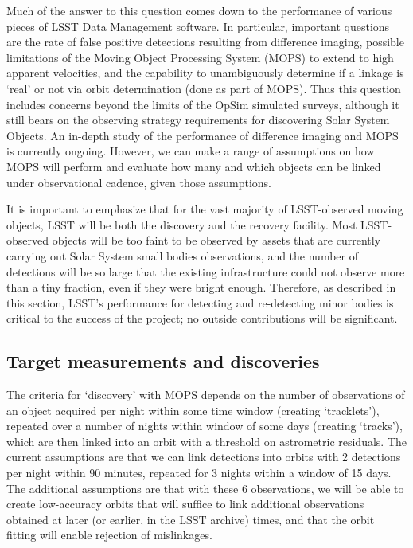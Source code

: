 Much of the answer to this question comes down to the performance of
various pieces of LSST Data Management software. In particular,
important questions are the
rate of false positive detections resulting from difference imaging, possible
limitations of the Moving Object Processing System (MOPS) to extend to high
apparent velocities, and the capability to unambiguously determine if
a linkage is `real' or not via orbit determination (done as part of
MOPS). Thus this question includes concerns beyond the limits of the OpSim simulated
surveys, although it still bears on the observing strategy requirements for
discovering Solar System Objects. An in-depth study of the performance
of difference imaging and MOPS is currently ongoing. However, we can
make a range of assumptions on how MOPS will perform and evaluate how
many and which objects can be linked under observational cadence, given those assumptions.

It is important to emphasize that for the vast majority of
LSST-observed moving objects, LSST will be both the discovery and the
recovery facility. Most LSST-observed objects will be too faint
to be observed by assets that are currently carrying out
Solar System small bodies observations, and the number of 
detections will be so large that the existing infrastructure
could not observe more than a tiny fraction, even if they 
were bright enough. Therefore, as described in this section,
LSST's performance for detecting and re-detecting minor
bodies is critical to the success of the project; no outside
contributions will be significant.



\subsection{Target measurements and discoveries}
\label{sec:\secname:targets}

The criteria for `discovery' with MOPS depends on the number
of observations of an object acquired per night within some time
window (creating `tracklets'), repeated over a number of nights within window of some
days (creating `tracks'), which are then linked into an orbit with a threshold on
astrometric residuals. The current assumptions are that we can link
detections into orbits with 2 detections per night within 90 minutes,
repeated for 3 nights within a window of 15 days. The additional assumptions are
that with these 6 observations, we will be able to create low-accuracy orbits that will suffice to link
additional observations obtained at later (or earlier, in the LSST
archive) times, and that the orbit fitting will enable rejection
of mislinkages.

